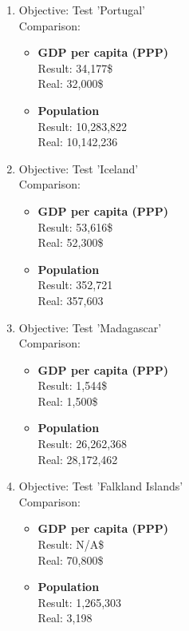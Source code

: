 \begin{enumerate}
    \item Objective: Test 'Portugal' \\
        Comparison:
        \begin{itemize}
            \item \textbf{GDP per capita (PPP)} \\
                Result: 34,177\$ \\
                Real: 32,000\$
            \item \textbf{Population} \\
                Result: 10,283,822 \\
                Real: 10,142,236
        \end{itemize}
    \item Objective: Test 'Iceland' \\
        Comparison:
        \begin{itemize}
            \item \textbf{GDP per capita (PPP)} \\
                Result: 53,616\$ \\
                Real: 52,300\$
            \item \textbf{Population} \\
                Result: 352,721 \\
                Real: 357,603 \\
        \end{itemize}
    \item Objective: Test 'Madagascar' \\
        Comparison:
        \begin{itemize}
            \item \textbf{GDP per capita (PPP)} \\
                Result: 1,544\$ \\
                Real: 1,500\$
            \item \textbf{Population} \\
                Result: 26,262,368 \\
                Real: 28,172,462 \\
        \end{itemize}
\newpage
    \item Objective: Test 'Falkland Islands' \\
        Comparison:
        \begin{itemize}
            \item \textbf{GDP per capita (PPP)} \\
                Result: N/A\$ \\
                Real: 70,800\$
            \item \textbf{Population} \\
                Result: 1,265,303 \\
                Real: 3,198 \\
        \end{itemize}
\end{enumerate}

